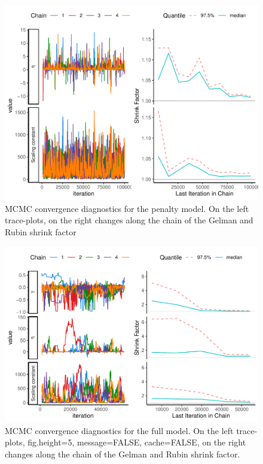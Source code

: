 \documentclass[
  12pt,
]{article}
\begin{document}
\begin{figure}
\includegraphics[width=1\linewidth]{manuscript_BE_files/figure-latex/diagNegFAA-1} \caption{MCMC convergence diagnostics for the penalty model. On the left trace-plots, on the right changes along the chain of the Gelman and Rubin shrink factor}\label{fig:diagNegFAA}
\end{figure}

\begin{figure}
\includegraphics[width=1\linewidth]{manuscript_BE_files/figure-latex/diagnosticsfullPAA-1} \caption{MCMC convergence diagnostics for the full model. On the left trace-plots, fig.height=5, message=FALSE, cache=FALSE, on the right changes along the chain of the Gelman and Rubin shrink factor.}\label{fig:diagnosticsfullPAA}
\end{figure}
\end{document}
